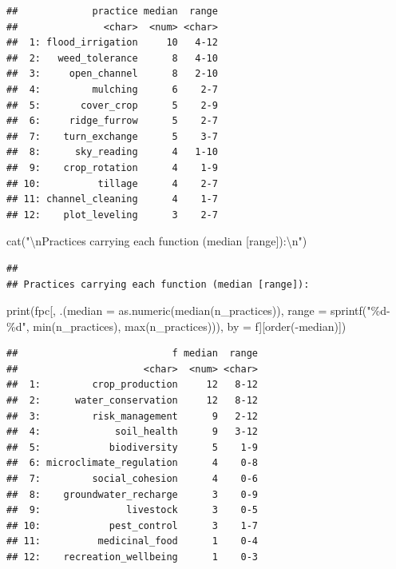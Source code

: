 \documentclass[
  11pt,
]{article}
\newenvironment{Shaded}{\begin{snugshade}}{\end{snugshade}}
\newcommand{\AttributeTok}[1]{\textcolor[rgb]{0.77,0.63,0.00}{#1}}
\newcommand{\FunctionTok}[1]{\textcolor[rgb]{0.00,0.00,0.00}{#1}}
\newcommand{\NormalTok}[1]{#1}
\newcommand{\SpecialCharTok}[1]{\textcolor[rgb]{0.00,0.00,0.00}{#1}}
\newcommand{\StringTok}[1]{\textcolor[rgb]{0.31,0.60,0.02}{#1}}
\begin{document}
\begin{verbatim}
##             practice median  range
##               <char>  <num> <char>
##  1: flood_irrigation     10   4-12
##  2:   weed_tolerance      8   4-10
##  3:     open_channel      8   2-10
##  4:         mulching      6    2-7
##  5:       cover_crop      5    2-9
##  6:     ridge_furrow      5    2-7
##  7:    turn_exchange      5    3-7
##  8:      sky_reading      4   1-10
##  9:    crop_rotation      4    1-9
## 10:          tillage      4    2-7
## 11: channel_cleaning      4    1-7
## 12:    plot_leveling      3    2-7
\end{verbatim}

\begin{Shaded}
\begin{Highlighting}[]
\FunctionTok{cat}\NormalTok{(}\StringTok{"}\SpecialCharTok{\textbackslash{}n}\StringTok{Practices carrying each function (median [range]):}\SpecialCharTok{\textbackslash{}n}\StringTok{"}\NormalTok{)}
\end{Highlighting}
\end{Shaded}

\begin{verbatim}
## 
## Practices carrying each function (median [range]):
\end{verbatim}

\begin{Shaded}
\begin{Highlighting}[]
\FunctionTok{print}\NormalTok{(fpc[, .(}\AttributeTok{median =} \FunctionTok{as.numeric}\NormalTok{(}\FunctionTok{median}\NormalTok{(n\_practices)),}
              \AttributeTok{range =} \FunctionTok{sprintf}\NormalTok{(}\StringTok{"\%d{-}\%d"}\NormalTok{, }\FunctionTok{min}\NormalTok{(n\_practices), }\FunctionTok{max}\NormalTok{(n\_practices))),}
          \AttributeTok{by =}\NormalTok{ f][}\FunctionTok{order}\NormalTok{(}\SpecialCharTok{{-}}\NormalTok{median)])}
\end{Highlighting}
\end{Shaded}

\begin{verbatim}
##                           f median  range
##                      <char>  <num> <char>
##  1:         crop_production     12   8-12
##  2:      water_conservation     12   8-12
##  3:         risk_management      9   2-12
##  4:             soil_health      9   3-12
##  5:            biodiversity      5    1-9
##  6: microclimate_regulation      4    0-8
##  7:         social_cohesion      4    0-6
##  8:    groundwater_recharge      3    0-9
##  9:               livestock      3    0-5
## 10:            pest_control      3    1-7
## 11:          medicinal_food      1    0-4
## 12:    recreation_wellbeing      1    0-3
\end{verbatim}
\end{document}
